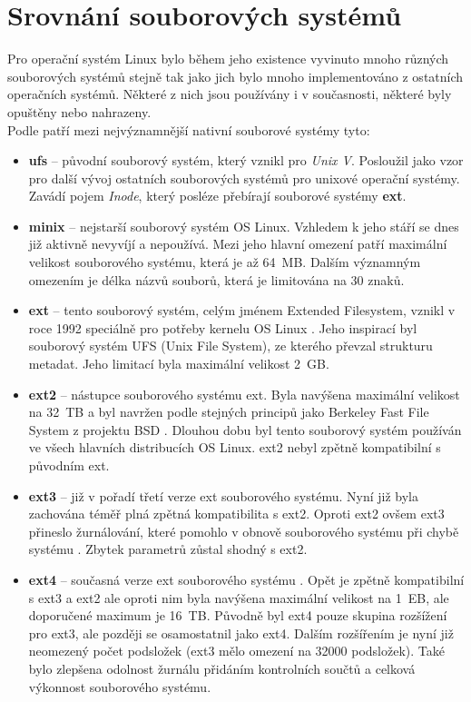 \section{Srovnání souborových systémů}
Pro operační systém Linux bylo během jeho existence vyvinuto mnoho různých souborových systémů stejně tak jako jich bylo mnoho implementováno z ostatních operačních systémů. Některé z nich jsou používány i v současnosti, některé byly opuštěny nebo nahrazeny.\\
Podle \cite{tldp-filesystem} patří mezi nejvýznamnější nativní souborové systémy tyto:
\begin{itemize}
    \item \textbf{ufs} -- původní souborový systém, který vznikl pro \textit{Unix V}. Posloužil jako vzor pro další vývoj ostatních souborových systémů pro unixové operační systémy. Zavádí pojem \textit{Inode}, který posléze přebírají souborové systémy \textbf{ext}.
    \item \textbf{minix} -- nejstarší souborový systém OS Linux. Vzhledem k jeho stáří se dnes již aktivně nevyvíjí a nepoužívá. Mezi jeho hlavní omezení patří maximální velikost souborového systému, která je až 64~MB. Dalším významným omezením je délka názvů souborů, která je limitována na 30 znaků.
    \item \textbf{ext} -- tento souborový systém, celým jménem Extended Filesystem, vznikl v roce 1992 speciálně pro potřeby kernelu OS Linux \cite{linmag-ext}. Jeho inspirací byl souborový systém UFS (Unix File System), ze kterého převzal strukturu metadat. Jeho limitací byla maximální velikost 2~GB.
    \item \textbf{ext2} -- nástupce souborového systému ext. Byla navýšena maximální velikost na 32~TB a byl navržen podle stejných principů jako Berkeley Fast File System z projektu BSD \cite{nongnu-ext2}. Dlouhou dobu byl tento souborový systém používán ve všech hlavních distribucích OS Linux. ext2 nebyl zpětně kompatibilní s původním ext.
    \item \textbf{ext3} -- již v pořadí třetí verze ext souborového systému. Nyní již byla zachována téměř plná zpětná kompatibilita s ext2. Oproti ext2 ovšem ext3 přineslo žurnálování, které pomohlo v obnově souborového systému při chybě systému \cite{paper-ext3}. Zbytek parametrů zůstal shodný s ext2.
    \item \textbf{ext4} -- současná verze ext souborového systému \cite{paper-ext4}. Opět je zpětně kompatibilní s ext3 a ext2 ale oproti nim byla navýšena maximální velikost na 1~EB, ale doporučené maximum je 16~TB. Původně byl ext4 pouze skupina rozšížení pro ext3, ale později se osamostatnil jako ext4. Dalším rozšířením je nyní již neomezený počet podsložek (ext3 mělo omezení na 32000 podsložek). Také bylo zlepšena odolnost žurnálu přidáním kontrolních součtů a celková výkonnost souborového systému.

\end{itemize}
